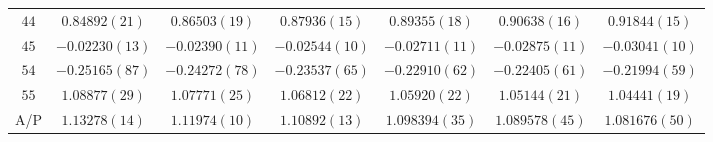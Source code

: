 \begin{table}
\begin{center}
\begin{tabular}{c|c c c c c c}
$44$ & $0.84892(21)$ & $0.86503(19)$ & $0.87936(15)$ & $0.89355(18)$ & $0.90638(16)$ & $0.91844(15)$ \\
$45$ & $-0.02230(13)$ & $-0.02390(11)$ & $-0.02544(10)$ & $-0.02711(11)$ & $-0.02875(11)$ & $-0.03041(10)$ \\
$54$ & $-0.25165(87)$ & $-0.24272(78)$ & $-0.23537(65)$ & $-0.22910(62)$ & $-0.22405(61)$ & $-0.21994(59)$ \\
$55$ & $1.08877(29)$ & $1.07771(25)$ & $1.06812(22)$ & $1.05920(22)$ & $1.05144(21)$ & $1.04441(19)$ \\
\hline
A/P & $1.13278(14)$ & $1.11974(10)$ & $1.10892(13)$ & $1.098394(35)$ & $1.089578(45)$ & $1.081676(50)$ \\
\hline
\hline
\end{tabular}
\end{center}
\end{table}